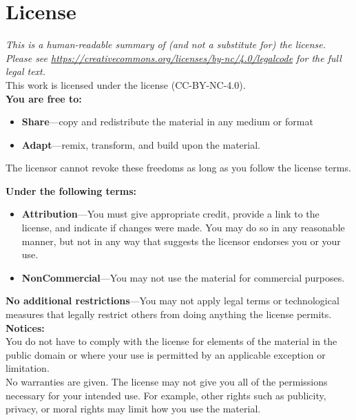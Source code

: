 \chapter{License}\label{s:license}

{\setlength{\parindent}{0em}

\emph{
  This is a human-readable summary of (and not a substitute for) the license.
  Please see \url{https://creativecommons.org/licenses/by-nc/4.0/legalcode} for the full legal text.
}\\

\noindent
This work is licensed under the
 license
(CC-BY-NC-4.0).\\

\noindent
\textbf{You are free to:}

\begin{itemize}
\item
  \textbf{Share}---copy and redistribute the material in any medium or
  format
\item
  \textbf{Adapt}---remix, transform, and build upon the material.
\end{itemize}

The licensor cannot revoke these freedoms as long as you follow the
license terms.

\textbf{Under the following terms:}

\begin{itemize}
\item
  \textbf{Attribution}---You must give appropriate credit, provide a link
  to the license, and indicate if changes were made. You may do so in
  any reasonable manner, but not in any way that suggests the licensor
  endorses you or your use. \\
\item
  \textbf{NonCommercial}---You may not use the material for commercial purposes.
\end{itemize}

\textbf{No additional restrictions}---You may not apply legal terms or
technological measures that legally restrict others from doing anything the
license permits.\\

\textbf{Notices:}\\

You do not have to comply with the license for elements of the
material in the public domain or where your use is permitted by an
applicable exception or limitation.\\

No warranties are given. The license may not give you all of the
permissions necessary for your intended use. For example, other rights
such as publicity, privacy, or moral rights may limit how you use the
material.

}
